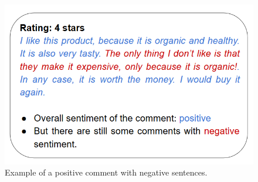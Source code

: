\begin{figure}[b]
\centerline{\includegraphics[scale=.5]{images/comment_example.png}}
\caption{Example of a positive comment with negative sentences.}
\label{comment_example}
\end{figure}

